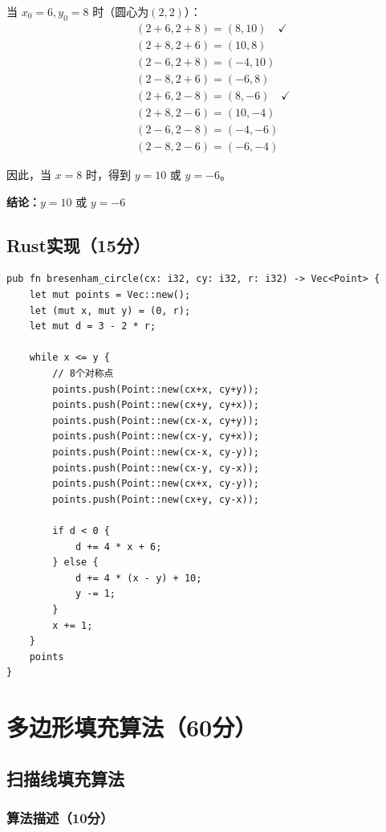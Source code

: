 ﻿\documentclass[12pt,a4paper]{article}
\begin{document}
当 $x_0 = 6, y_0 = 8$ 时（圆心为$(2,2)$）：
\begin{align*}
&(2+6, 2+8) = (8, 10) \quad \checkmark \\
&(2+8, 2+6) = (10, 8) \\
&(2-6, 2+8) = (-4, 10) \\
&(2-8, 2+6) = (-6, 8) \\
&(2+6, 2-8) = (8, -6) \quad \checkmark \\
&(2+8, 2-6) = (10, -4) \\
&(2-6, 2-8) = (-4, -6) \\
&(2-8, 2-6) = (-6, -4)
\end{align*}

因此，当 $x=8$ 时，得到 $y=10$ 或 $y=-6$。

\textbf{结论：}$\boxed{y=10\text{ 或 }y=-6}$

\subsection{Rust实现（15分）}

\begin{lstlisting}
pub fn bresenham_circle(cx: i32, cy: i32, r: i32) -> Vec<Point> {
    let mut points = Vec::new();
    let (mut x, mut y) = (0, r);
    let mut d = 3 - 2 * r;
    
    while x <= y {
        // 8个对称点
        points.push(Point::new(cx+x, cy+y));
        points.push(Point::new(cx+y, cy+x));
        points.push(Point::new(cx-x, cy+y));
        points.push(Point::new(cx-y, cy+x));
        points.push(Point::new(cx-x, cy-y));
        points.push(Point::new(cx-y, cy-x));
        points.push(Point::new(cx+x, cy-y));
        points.push(Point::new(cx+y, cy-x));
        
        if d < 0 {
            d += 4 * x + 6;
        } else {
            d += 4 * (x - y) + 10;
            y -= 1;
        }
        x += 1;
    }
    points
}
\end{lstlisting}

\section{多边形填充算法（60分）}

\subsection{扫描线填充算法}

\subsubsection{算法描述（10分）}
\end{document}
